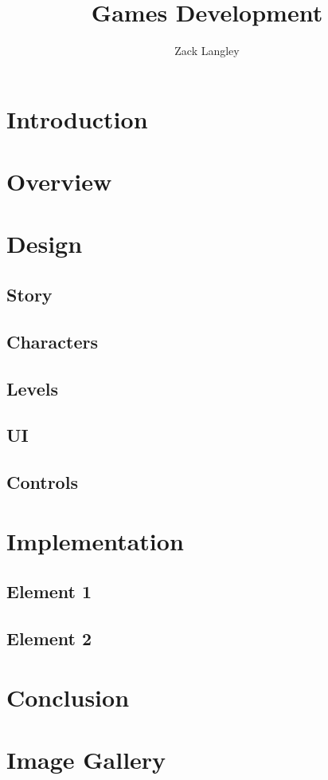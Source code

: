 \documentclass[progress]{cmpreport}
\title{Games Development}
\author{Zack Langley}
\begin{document}
\section{Introduction}

\section{Overview}

\section{Design}

\subsection{Story}

\subsection{Characters}

\subsection{Levels}

\subsection{UI}

\subsection{Controls}

\section{Implementation}

\subsection{Element 1}

\subsection{Element 2}

\section{Conclusion}


\clearpage

\appendix

\section{Image Gallery}


\clearpage
\end{document}
